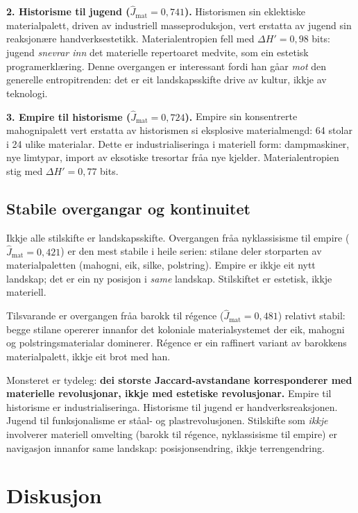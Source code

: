 \documentclass[10pt, a4paper, twocolumn]{article}
\begin{document}
\textbf{2. Historisme til jugend ($\hat{J}_{\text{mat}} = 0{,}741$).} Historismen sin eklektiske materialpalett, driven av industriell masseproduksjon, vert erstatta av jugend sin reaksjon\ae re handverksestetikk. Materialentropien fell med $\Delta H' = 0{,}98$ bits: jugend \emph{snevrar inn} det materielle repertoaret medvite, som ein estetisk programerkl\ae ring. Denne overgangen er interessant fordi han g\r{a}ar \emph{mot} den generelle entropitrenden: det er eit landskapsskifte drive av kultur, ikkje av teknologi.

\textbf{3. Empire til historisme ($\hat{J}_{\text{mat}} = 0{,}724$).} Empire sin konsentrerte mahognipalett vert erstatta av historismen si eksplosive materialmengd: 64 stolar i 24 ulike materialar. Dette er industrialiseringa i materiell form: dampmaskiner, nye limtypar, import av eksotiske tresortar fr\r{a}a nye kjelder. Materialentropien stig med $\Delta H' = 0{,}77$ bits.


\subsection{Stabile overgangar og kontinuitet}

Ikkje alle stilskifte er landskapsskifte. Overgangen fr\r{a}a nyklassisisme til empire ($\hat{J}_{\text{mat}} = 0{,}421$) er den mest stabile i heile serien: stilane deler storparten av materialpaletten (mahogni, eik, silke, polstring). Empire er ikkje eit nytt landskap; det er ein ny posisjon i \emph{same} landskap. Stilskiftet er estetisk, ikkje materiell.

Tilsvarande er overgangen fr\r{a}a barokk til r\'{e}gence ($\hat{J}_{\text{mat}} = 0{,}481$) relativt stabil: begge stilane opererer innanfor det koloniale materialsystemet der eik, mahogni og polstringsmaterialar dominerer. R\'{e}gence er ein raffinert variant av barokkens materialpalett, ikkje eit brot med han.

Monsteret er tydeleg: \textbf{dei storste Jaccard-avstandane korresponderer med materielle revolusjonar, ikkje med estetiske revolusjonar.} Empire til historisme er industrialiseringa. Historisme til jugend er handverksreaksjonen. Jugend til funksjonalisme er st\r{a}al- og plastrevolusjonen. Stilskifte som \emph{ikkje} involverer materiell omvelting (barokk til r\'{e}gence, nyklassisisme til empire) er navigasjon innanfor same landskap: posisjonsendring, ikkje terrengendring.


\section{Diskusjon}
\end{document}
